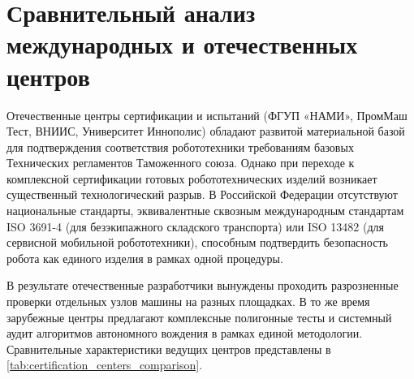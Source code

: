 \newpage
\section{Сравнительный анализ международных и отечественных центров}

Отечественные центры сертификации и испытаний (ФГУП «НАМИ», ПромМаш Тест, ВНИИС, Университет Иннополис) обладают развитой материальной базой для подтверждения соответствия робототехники требованиям базовых Технических регламентов Таможенного союза. Однако при переходе к комплексной сертификации готовых робототехнических изделий возникает существенный технологический разрыв. В Российской Федерации отсутствуют национальные стандарты, эквивалентные сквозным международным стандартам ISO 3691-4 (для безэкипажного складского транспорта) или ISO 13482 (для сервисной мобильной робототехники), способным подтвердить безопасность робота как единого изделия в рамках одной процедуры.

В результате отечественные разработчики вынуждены проходить разрозненные проверки отдельных узлов машины на разных площадках. В то же время зарубежные центры предлагают комплексные полигонные тесты и системный аудит алгоритмов автономного вождения в рамках единой методологии. Сравнительные характеристики ведущих центров представлены в \cref{tab:certification_centers_comparison}.

